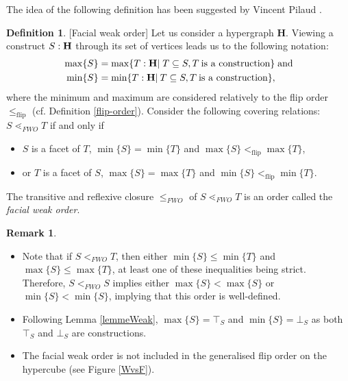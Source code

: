 \documentclass{article}
\theoremstyle{plain}
\theoremstyle{definition}
\newtheorem{definition}[thm]{Definition}
\newtheorem{remark}[thm]{Remark}
\newcommand{\set}[1]{\{#1\}}
\begin{document}
The idea of the following definition has been suggested by Vincent Pilaud 
 \cite{private-comm}.

\begin{definition} \label{fwo-def}
[Facial weak order] Let us consider a hypergraph $\mathbf{H}$. Viewing a construct $S: {\bf H}$ through its set of vertices leads us to the following notation:
\begin{align*}
\max\set{S}&=\max\{T: {\bf H}|\; T\subseteq S, T\:\mbox{is a construction} \} \;\mbox{and}\\
\min\set{S}&=\min\{T: {\bf H}|\:T\subseteq S, T\:\mbox{is a construction}\},
\end{align*}
where the minimum and maximum are considered relatively to the flip order $\leq_{\operatorname{flip}}$  (cf. Definition \ref{flip-order}).
Consider the following covering relations: $S \lessdot_{\mathit{FWO}} T$ if and only if
\begin{itemize}
 \item $S$ is a facet of $T$, $\min\set{S}=\min\set{T}$ and $\max\set{S}<_{\operatorname{flip}} \max\set{T}$,
 \item or $T$ is a facet of $S$, $\max\set{S}=\max\set{T}$ and $\min\set{S}<_{\operatorname{flip}} \min\set{T}$.
\end{itemize}

The transitive and reflexive closure $\leq_{\mathit{FWO}}$ of $S \lessdot_{\mathit{FWO}} T$ is an order called the \emph{facial weak order}.
\end{definition}



\begin{remark} \label{min-equals-bot}
\begin{itemize}
\item Note that if $S <_{\mathit{FWO}} T$, then either $\min\set{S}\leq \min\set{T}$ and $\max\set{S}\leq \max\set{T}$, at least one of these inequalities being strict. Therefore, $S <_{\mathit{FWO}} S$ implies either $\max\set{S}< \max\set{S}$ or $\min\set{S}< \min\set{S}$, implying that this order is well-defined.
\item Following Lemma \ref{lemmeWeak}, $\max\set{S}=\top_S$ and $\min\set{S}=\bot_S$ as both $\top_S$ and $\bot_S$ are constructions.
\item The facial weak order is not included in the generalised flip order on the hypercube (see Figure \ref{WvsF}).
\end{itemize}
\end{remark}
\end{document}

